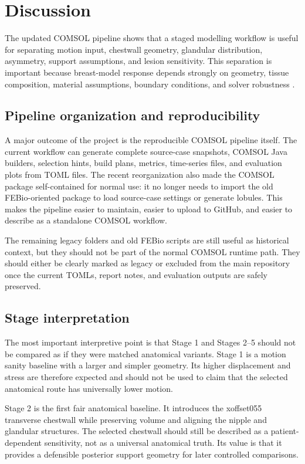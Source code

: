 \section{Discussion}

The updated COMSOL pipeline shows that a staged modelling workflow is useful for separating motion input, chestwall geometry, glandular distribution, asymmetry, support assumptions, and lesion sensitivity. This separation is important because breast-model response depends strongly on geometry, tissue composition, material assumptions, boundary conditions, and solver robustness \cite{Samani2001,Hsu2011,Ramiao2016,Chen2024,Chen2025}.

\subsection{Pipeline organization and reproducibility}

A major outcome of the project is the reproducible COMSOL pipeline itself. The current workflow can generate complete source-case snapshots, COMSOL Java builders, selection hints, build plans, metrics, time-series files, and evaluation plots from TOML files. The recent reorganization also made the COMSOL package self-contained for normal use: it no longer needs to import the old FEBio-oriented package to load source-case settings or generate lobules. This makes the pipeline easier to maintain, easier to upload to GitHub, and easier to describe as a standalone COMSOL workflow.

The remaining legacy folders and old FEBio scripts are still useful as historical context, but they should not be part of the normal COMSOL runtime path. They should either be clearly marked as legacy or excluded from the main repository once the current TOMLs, report notes, and evaluation outputs are safely preserved.

\subsection{Stage interpretation}

The most important interpretive point is that Stage 1 and Stages 2--5 should not be compared as if they were matched anatomical variants. Stage 1 is a motion sanity baseline with a larger and simpler geometry. Its higher displacement and stress are therefore expected and should not be used to claim that the selected anatomical route has universally lower motion.

Stage 2 is the first fair anatomical baseline. It introduces the xoffset055 transverse chestwall while preserving volume and aligning the nipple and glandular structures. The selected chestwall should still be described as a patient-dependent sensitivity, not as a universal anatomical truth. Its value is that it provides a defensible posterior support geometry for later controlled comparisons.

